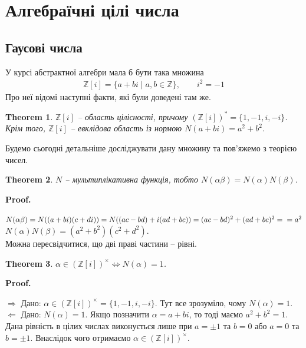 \documentclass[a4paper, 10pt]{article}
\makeatletter
\def\rightproof{$\boxed{\Rightarrow}$ }
\def\leftproof{$\boxed{\Leftarrow}$ }
\theoremstyle{theoremdd}
\newtheorem{theorem}{Theorem}[subsection]
\theoremstyle{theoremdd}
\theoremstyle{theoremdd}
\theoremstyle{theoremdd}
\theoremstyle{theoremdd}
\theoremstyle{theoremdd}
\theoremstyle{theoremdd}
\theoremstyle{theoremdd}
\theoremstyle{theoremdd}
\theoremstyle{theoremdd}
\theoremstyle{theoremdd}
\theoremstyle{theoremdd}
\theoremstyle{theoremdd}
\theoremstyle{theoremdd}
\theoremstyle{theoremdd}
\renewenvironment{proof}[1][Proof.\\]{\par
\pushQED{\hfill \qed}%
\normalfont \topsep6\p@\@plus6\p@\relax
\trivlist
\item\relax
{\bfseries
#1\@addpunct{.}}\hspace\labelsep\ignorespaces
}{%
\popQED\endtrivlist\@endpefalse
}
\makeatother
\begin{document}
%

\tableofcontents
\newpage
\section{Алгебраїчні цілі числа}
\subsection{Гаусові числа}
У курсі абстрактної алгебри мала б бути така множина
\begin{align*}
\mathbb{Z}[i] = \{a + bi \mid a,b \in \mathbb{Z}\},\qquad i^2 = -1
\end{align*}
Про неї відомі наступні факти, які були доведені там же.
\begin{theorem}
$\mathbb{Z}[i]$ -- область цілісності, причому $(\mathbb{Z}[i])^* = \{1,-1, i, -i\}$.\\
Крім того, $\mathbb{Z}[i]$ -- евклідова область із нормою $N(a+bi) = a^2 + b^2$.
\end{theorem}

Будемо сьогодні детальніше досліджувати дану множину та пов'яжемо з теорією чисел.

\begin{theorem}
$N$ -- мультиплікативна функція, тобто $N(\alpha \beta) = N(\alpha) N(\beta)$.
\end{theorem}

\begin{proof}
$N(\alpha \beta) = N((a+bi)(c+di)) = N((ac-bd) + i(ad + bc)) = (ac-bd)^2 + (ad+bc)^2 = \\
= a^2$\\
$N(\alpha) N(\beta) = (a^2 + b^2)(c^2 + d^2)$.\\
Можна пересвідчитися, що дві праві частини -- рівні.
\end{proof}

\begin{theorem}
$\alpha \in (\mathbb{Z}[i])^\times \iff N(\alpha) = 1$.
\end{theorem}

\begin{proof}
\rightproof Дано: $\alpha \in (\mathbb{Z}[i])^\times = \{1,-1, i, -i\}$. Тут все зрозуміло, чому $N(\alpha) = 1$.
\bigskip \\
\leftproof Дано: $N(\alpha) = 1$. Якщо позначити $\alpha = a + bi$, то тоді маємо $a^2 + b^2 = 1$. Дана рівність в цілих числах виконується лише при $a = \pm 1$ та $b = 0$ або $a = 0$ та $b = \pm 1$. Внаслідок чого отримаємо $\alpha \in (\mathbb{Z}[i])^\times$.
\end{proof}
\end{document}
